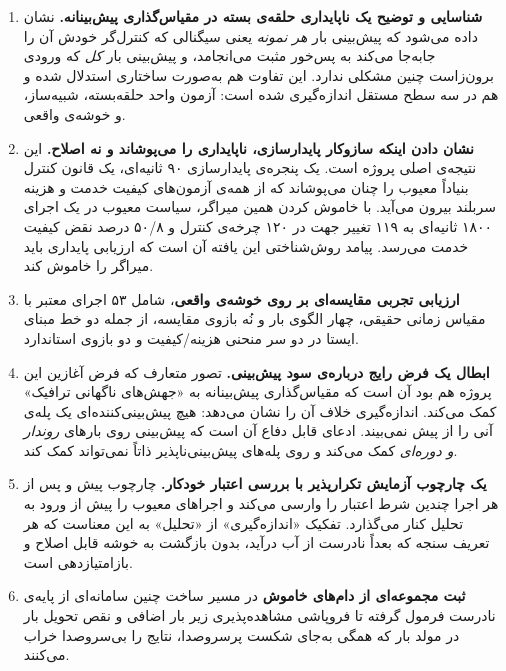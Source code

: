 \begin{enumerate}
  \item \textbf{شناسایی و توضیح یک ناپایداری حلقه‌ی بسته در مقیاس‌گذاری پیش‌بینانه.} نشان داده
  می‌شود که پیش‌بینی بار \emph{هر نمونه} \mdash{} یعنی سیگنالی که کنترل‌گر خودش آن را جابه‌جا می‌کند \mdash{}
  به پس‌خور مثبت می‌انجامد، و پیش‌بینی بار \emph{کل} \mdash{} که ورودی برون‌زاست \mdash{} چنین مشکلی ندارد.
  این تفاوت هم به‌صورت ساختاری استدلال شده و هم در سه سطح مستقل اندازه‌گیری شده است: آزمون
  واحد حلقه‌بسته، شبیه‌ساز، و خوشه‌ی واقعی.

  \item \textbf{نشان دادن اینکه سازوکار پایدارسازی، ناپایداری را می‌پوشاند و نه اصلاح.} این
  نتیجه‌ی اصلی پروژه است. یک پنجره‌ی پایدارسازی ۹۰ ثانیه‌ای، یک قانون کنترل بنیاداً معیوب را
  چنان می‌پوشاند که از همه‌ی آزمون‌های کیفیت خدمت و هزینه سربلند بیرون می‌آید. با خاموش کردن
  همین میراگر، سیاست معیوب در یک اجرای ۱۸۰۰ ثانیه‌ای به ۱۱۹ تغییر جهت در ۱۲۰ چرخه‌ی کنترل و
  ۵۰/۸ درصد نقض کیفیت خدمت می‌رسد. پیامد روش‌شناختی این یافته آن است که ارزیابی پایداری باید
  میراگر را خاموش کند.

  \item \textbf{ارزیابی تجربی مقایسه‌ای بر روی خوشه‌ی واقعی}، شامل ۵۳ اجرای معتبر با مقیاس
  زمانی حقیقی، چهار الگوی بار و نُه بازوی مقایسه، از جمله دو خط مبنای ایستا در دو سر منحنی
  هزینه/کیفیت و دو بازوی  استاندارد.

  \item \textbf{ابطال یک فرض رایج درباره‌ی سود پیش‌بینی.} تصور متعارف \mdash{} که فرض
  آغازین این پروژه هم بود \mdash{} آن است که مقیاس‌گذاری پیش‌بینانه به «جهش‌های ناگهانی
  ترافیک» کمک می‌کند. اندازه‌گیری خلاف آن را نشان می‌دهد: هیچ
  پیش‌بینی‌کننده‌ای یک پله‌ی آنی را از پیش نمی‌بیند. ادعای قابل دفاع آن است که پیش‌بینی روی
  بارهای \emph{روندار و دوره‌ای} کمک می‌کند و روی پله‌های پیش‌بینی‌ناپذیر ذاتاً نمی‌تواند
  کمک کند.

  \item \textbf{یک چارچوب آزمایش تکرارپذیر با بررسی اعتبار خودکار.} چارچوب پیش و پس از هر اجرا
  چندین شرط اعتبار را وارسی می‌کند و اجراهای معیوب را پیش از ورود به تحلیل کنار می‌گذارد.
  تفکیک «اندازه‌گیری» از «تحلیل» به این معناست که هر تعریف سنجه که بعداً نادرست از آب درآید،
  بدون بازگشت به خوشه قابل اصلاح و بازامتیازدهی است.

  \item \textbf{ثبت مجموعه‌ای از دام‌های خاموش} در مسیر ساخت چنین سامانه‌ای \mdash{} از پایه‌ی نادرست
  فرمول گرفته تا فروپاشی مشاهده‌پذیری زیر بار اضافی و نقص تحویل بار در مولد بار \mdash{} که همگی
  به‌جای شکست پرسروصدا، نتایج را بی‌سروصدا خراب می‌کنند.
\end{enumerate}

